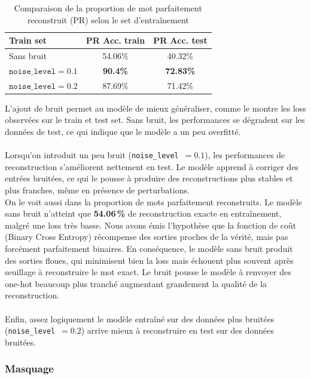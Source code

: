 \documentclass{article}
\begin{document}
\begin{table}[H]
\centering
\begin{tabular}{lcc}
\hline
\textbf{Train set} & \textbf{PR Acc. train} & \textbf{PR Acc. test}  \\
\hline
Sans bruit & 54.06\% & 40.32\% \\
$\texttt{noise\_level} = 0.1$ & \textbf{90.4\%} & \textbf{72.83\%} \\
$\texttt{noise\_level} = 0.2$ & 87.69\% & 71.42\%  \\
\hline
\end{tabular}
\caption{Comparaison de la proportion de mot parfaitement reconstruit (PR) selon le set d'entraînement}
\end{table}

L’ajout de bruit permet au modèle de mieux généraliser, comme le montre les loss observées sur le train et test set. Sans bruit, les performances se dégradent sur les données de test, ce qui indique que le modèle a un peu overfitté.
\\ \\
Lorsqu’on introduit un peu bruit (\texttt{noise\_level}~$=0.1$), les performances de reconstruction s’améliorent nettement en test. Le modèle apprend à corriger des entrées bruitées, ce qui le pousse à produire des reconstructions plus stables et plus franches, même en présence de perturbations.
\\
On le voit aussi dans la proportion de mots parfaitement reconstruits. Le modèle sans bruit n’atteint que \textbf{54.06\,\%} de reconstruction exacte en entraînement, malgré une loss très basse. Nous avons émis l'hypothèse que la fonction de coût (Binary Cross Entropy) récompense des sorties proches de la vérité, mais pas forcément parfaitement binaires. En conséquence, le modèle sans bruit produit des sorties floues, qui minimisent bien la loss mais échouent plus souvent après seuillage à reconstruire le mot exact. Le bruit pousse le modèle à renvoyer des one-hot beaucoup plus tranché augmentant grandement la qualité de la reconstruction.
\\ \\
Enfin, assez logiquement le modèle entraîné sur des données plus bruitées (\texttt{noise\_level}~$=0.2$) arrive mieux à reconstruire en test sur des données bruitées.



\subsubsection{Masquage}
\end{document}
